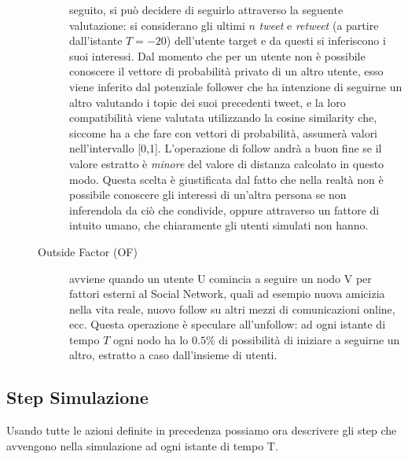 \documentclass[a4paper,12pt]{article}
\begin{document}
\begin{description}
\begin{description}
      seguito, si pu\`o decidere di seguirlo attraverso la seguente 
      valutazione: si considerano gli ultimi $n$ \textit{tweet} e \textit{retweet} (a partire dall'istante $T = -20$)
      dell'utente target e da questi si inferiscono i suoi interessi.
      Dal momento che per un utente non \`e possibile conoscere il vettore di probabilit\`a privato di un altro utente, esso viene inferito dal potenziale follower che ha intenzione di seguirne un altro valutando i topic dei suoi precedenti tweet, e la loro compatibilit\`a viene valutata utilizzando la cosine similarity che, siccome ha a che fare con vettori di probabilità, assumerà valori nell'intervallo [0,1]. L'operazione di follow andrà a buon fine se il valore estratto è \textit{minore} del valore di distanza calcolato in questo modo.
    Questa scelta \`e giustificata dal fatto che nella realt\`a non \`e possibile conoscere gli interessi di un'altra persona se non inferendola da ci\`o che condivide, oppure attraverso un fattore di intuito umano, che chiaramente gli utenti simulati non hanno.
      \item[Outside Factor (OF)] avviene quando un utente U comincia
      a seguire un nodo V per fattori esterni al Social Network, 
      quali ad esempio nuova amicizia nella vita reale, nuovo
      follow su altri mezzi di comunicazioni online, ecc. Questa operazione è speculare all'unfollow: ad ogni istante di tempo $T$ ogni nodo ha lo $0.5\%$ di possibilità di iniziare a seguirne un altro, estratto a caso dall'insieme di utenti. 
	  
    \end{description}
\end{description}



\subsection{Step Simulazione}
\label{subsec:step}

Usando tutte le azioni definite in precedenza possiamo ora descrivere gli 
step che avvengono nella simulazione ad ogni istante di tempo T.
\end{document}
